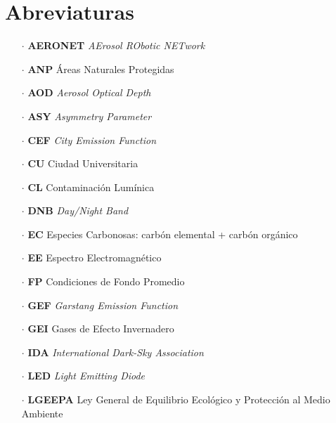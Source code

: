\chapter{Abreviaturas}

\begin{itemize}

\item[$\cdot$] \textbf{AERONET} \textit{AErosol RObotic NETwork}

\item[$\cdot$] \textbf{ANP} Áreas Naturales Protegidas

\item[$\cdot$] \textbf{AOD} \textit{Aerosol Optical Depth}

\item[$\cdot$] \textbf{ASY} \textit{Asymmetry Parameter}

\item[$\cdot$] \textbf{CEF} \textit{City Emission Function}

\item[$\cdot$] \textbf{CU} Ciudad Universitaria

\item[$\cdot$] \textbf{CL} Contaminación Lumínica

\item[$\cdot$] \textbf{DNB} \textit{Day/Night Band}

\item[$\cdot$] \textbf{EC} Especies Carbonosas: carbón elemental + carbón orgánico

\item[$\cdot$] \textbf{EE} Espectro Electromagnético

\item[$\cdot$] \textbf{FP} Condiciones de Fondo Promedio

\item[$\cdot$] \textbf{GEF} \textit{Garstang Emission Function}

\item[$\cdot$] \textbf{GEI} Gases de Efecto Invernadero

\item[$\cdot$] \textbf{IDA} \textit{International Dark-Sky Association}

\item[$\cdot$] \textbf{LED} \textit{Light Emitting Diode}

\item[$\cdot$] \textbf{LGEEPA} Ley General de Equilibrio Ecológico y Protección al Medio Ambiente


\end{itemize}
